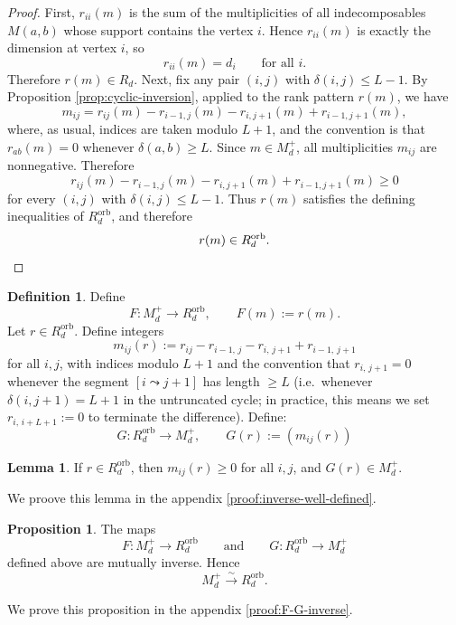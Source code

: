\documentclass{article}
\theoremstyle{definition}
\newtheorem{proposition}[theorem]{Proposition}
\newtheorem{lemma}[theorem]{Lemma}
\newtheorem{definition}[theorem]{Definition}
\begin{document}
\begin{proof}
First, \(r_{ii}(m)\) is the sum of the multiplicities of all
indecomposables \(M(a,b)\) whose support contains the vertex \(i\). Hence \(r_{ii}(m)\) is exactly the
dimension at vertex \(i\), so
\[
r_{ii}(m)=d_i
\qquad\text{for all }i.
\]
Therefore \(r(m)\in R_d\).
\noindent
Next, fix any pair \((i,j)\) with \(\delta(i,j)\le L - 1\). By Proposition \ref{prop:cyclic-inversion}, applied to the rank pattern
\(r(m)\), we have
\[
m_{ij}
=
r_{ij}(m)-r_{i-1,j}(m)-r_{i,j+1}(m)+r_{i-1,j+1}(m),
\]
where, as usual, indices are taken modulo \(L+1\), and the convention is that
\(r_{ab}(m)=0\) whenever \(\delta(a,b)\ge L\).
\noindent
Since \(m\in M_d^+\), all multiplicities \(m_{ij}\) are nonnegative. Therefore
\[
r_{ij}(m)-r_{i-1,j}(m)-r_{i,j+1}(m)+r_{i-1,j+1}(m)\ge 0
\]
for every \((i,j)\) with \(\delta(i,j)\le L - 1\).
\noindent
Thus \(r(m)\) satisfies the defining inequalities of \(R_d^{\mathrm{orb}}\), and therefore
\[
r(m)\in R_d^{\mathrm{orb}}.
\qedhere
\]
\end{proof}
\begin{definition}
Define
\[
F: M_d^+ \longrightarrow R_d^{\mathrm{orb}},\qquad F(m):=r(m).
\]
Let $r\in R_d^{\mathrm{orb}}$. Define integers
\begin{equation}\label{eq:inverse-map}
m_{ij}(r)
:=r_{ij}
-
r_{i-1,\,j}
-
r_{i,\,j+1}
+
r_{i-1,\,j+1}
\end{equation}
for all $i,j$, with indices modulo $L+1$ and the convention that
$r_{i,\,j+1}=0$ whenever the segment $[i\leadsto j+1]$ has length $\ge L$
(i.e.\ whenever $\delta(i,j+1)=L+1$ in the untruncated cycle; in practice, this
means we set $r_{i,\,i+L+1}:=0$ to terminate the difference).
Define:
\begin{equation*}
    G: R_d^{\mathrm{orb}} \longrightarrow M_d^+,\qquad G(r):=(m_{ij}(r))
\end{equation*}
\end{definition}
\begin{lemma}\label{lem:inverse-well-defined}
If \(r\in R_d^{\mathrm{orb}}\), then \(m_{ij}(r)\ge 0\) for all \(i,j\), and
\(G(r)\in M_d^+\).
\end{lemma}
\noindent
We proove this lemma in the appendix \ref{proof:inverse-well-defined}.
\begin{proposition}\label{prop:F-G-inverse}
The maps
\[
F:M_d^+\longrightarrow R_d^{\mathrm{orb}}
\qquad\text{and}\qquad
G:R_d^{\mathrm{orb}}\longrightarrow M_d^+
\]
defined above are mutually inverse. Hence
\[
M_d^+ \xrightarrow{\sim} R_d^{\mathrm{orb}}.
\]
\end{proposition}
\noindent
We prove this proposition in the appendix \ref{proof:F-G-inverse}.
\end{document}
